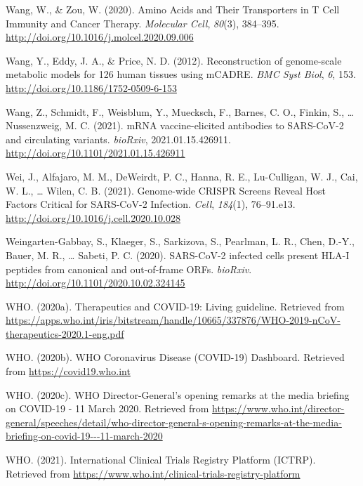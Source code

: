 \documentclass[12pt,twoside,openany,\mydriver]{thesis}  %
\begin{document}
\leavevmode\hypertarget{ref-wang_amino_2020}{}%
Wang, W., \& Zou, W. (2020). Amino Acids and Their Transporters in T Cell Immunity and Cancer Therapy. \emph{Molecular Cell}, \emph{80}(3), 384--395. \url{http://doi.org/10.1016/j.molcel.2020.09.006}

\leavevmode\hypertarget{ref-wang_reconstruction_2012}{}%
Wang, Y., Eddy, J. A., \& Price, N. D. (2012). Reconstruction of genome-scale metabolic models for 126 human tissues using mCADRE. \emph{BMC Syst Biol}, \emph{6}, 153. \url{http://doi.org/10.1186/1752-0509-6-153}

\leavevmode\hypertarget{ref-wang_mrna_2021}{}%
Wang, Z., Schmidt, F., Weisblum, Y., Muecksch, F., Barnes, C. O., Finkin, S., \ldots{} Nussenzweig, M. C. (2021). mRNA vaccine-elicited antibodies to SARS-CoV-2 and circulating variants. \emph{bioRxiv}, 2021.01.15.426911. \url{http://doi.org/10.1101/2021.01.15.426911}

\leavevmode\hypertarget{ref-wei_genome-wide_2021}{}%
Wei, J., Alfajaro, M. M., DeWeirdt, P. C., Hanna, R. E., Lu-Culligan, W. J., Cai, W. L., \ldots{} Wilen, C. B. (2021). Genome-wide CRISPR Screens Reveal Host Factors Critical for SARS-CoV-2 Infection. \emph{Cell}, \emph{184}(1), 76--91.e13. \url{http://doi.org/10.1016/j.cell.2020.10.028}

\leavevmode\hypertarget{ref-weingarten-gabbay_sars-cov-2_2020}{}%
Weingarten-Gabbay, S., Klaeger, S., Sarkizova, S., Pearlman, L. R., Chen, D.-Y., Bauer, M. R., \ldots{} Sabeti, P. C. (2020). SARS-CoV-2 infected cells present HLA-I peptides from canonical and out-of-frame ORFs. \emph{bioRxiv}. \url{http://doi.org/10.1101/2020.10.02.324145}

\leavevmode\hypertarget{ref-who_therapeutics_2020}{}%
WHO. (2020a). Therapeutics and COVID-19: Living guideline. Retrieved from \url{https://apps.who.int/iris/bitstream/handle/10665/337876/WHO-2019-nCoV-therapeutics-2020.1-eng.pdf}

\leavevmode\hypertarget{ref-who_who_2020-1}{}%
WHO. (2020b). WHO Coronavirus Disease (COVID-19) Dashboard. Retrieved from \url{https://covid19.who.int}

\leavevmode\hypertarget{ref-who_who_2020}{}%
WHO. (2020c). WHO Director-General's opening remarks at the media briefing on COVID-19 - 11 March 2020. Retrieved from \url{https://www.who.int/director-general/speeches/detail/who-director-general-s-opening-remarks-at-the-media-briefing-on-covid-19---11-march-2020}

\leavevmode\hypertarget{ref-who_international_2021}{}%
WHO. (2021). International Clinical Trials Registry Platform (ICTRP). Retrieved from \url{https://www.who.int/clinical-trials-registry-platform}
\end{document}
